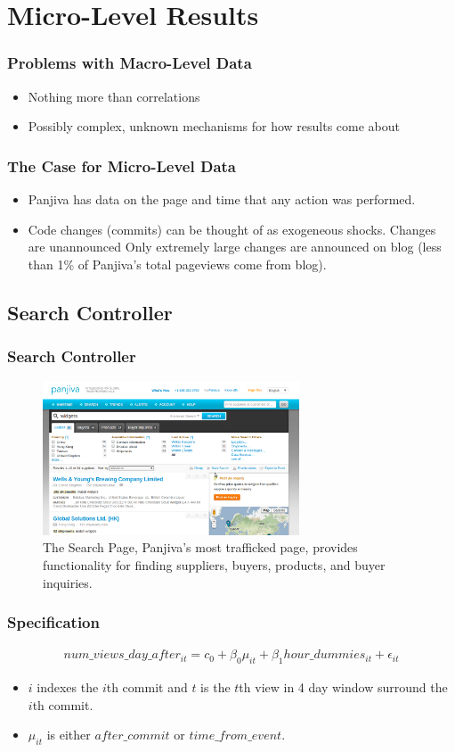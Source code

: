 \documentclass[xcolor=pdftex,dvipsnames,table]{beamer}
\begin{document}
\section{Micro-Level Results}

\frame
{
    \frametitle{Problems with Macro-Level Data}
    \begin{itemize}
    \item Nothing more than correlations
    \item Possibly complex, unknown mechanisms for how results come about
    \end{itemize}
}

\frame
{
    \frametitle{The Case for Micro-Level Data}
    \begin{itemize}
    \item Panjiva has data on the page and time that any action was performed.
    \item Code changes (commits) can be thought of as exogeneous shocks.
        \subitem Changes are unannounced
        \subitem Only extremely large changes are announced on blog (less than 1\% of Panjiva's total pageviews come from blog).
    \end{itemize}
}

\subsection{Search Controller}

\frame
{
    \frametitle{Search Controller}
    \begin{figure}
    \centering
    \includegraphics[width=3in]{pictures/search_page.png}
    \caption{The Search Page, Panjiva's most trafficked page, provides functionality for finding suppliers, buyers, products, and buyer inquiries.}
    \end{figure}
}

\frame
{
    \frametitle{Specification}
    \begin{eqnarray}
    num\_views\_day\_after_{it} = c_0 + \beta_0 \mu_{it} + \beta_1 hour\_dummies_{it} + \epsilon_{it}
    \end{eqnarray}

    \begin{itemize}
        \item $i$ indexes the $i$th commit and $t$ is the $t$th view in 4 day window surround the $i$th commit.
        \item $\mu_{it}$ is either $after\_commit$ or $time\_from\_event$. 
    \end{itemize}
}
\end{document}

